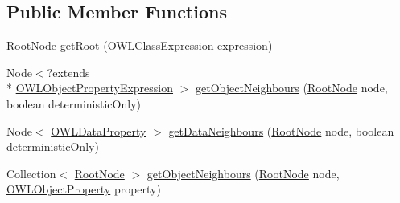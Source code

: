 \subsection*{Public Member Functions}
\begin{DoxyCompactItemize}
\item 
\hyperlink{interfaceorg_1_1semanticweb_1_1owlapi_1_1reasoner_1_1knowledgeexploration_1_1_o_w_l_knowledge_explorer_reasoner_1_1_root_node}{Root\-Node} \hyperlink{interfaceorg_1_1semanticweb_1_1owlapi_1_1reasoner_1_1knowledgeexploration_1_1_o_w_l_knowledge_explorer_reasoner_a97cbd43ff8f0c09b8eb188fc8f0d8dcf}{get\-Root} (\hyperlink{interfaceorg_1_1semanticweb_1_1owlapi_1_1model_1_1_o_w_l_class_expression}{O\-W\-L\-Class\-Expression} expression)
\item 
Node$<$?extends \\*
\hyperlink{interfaceorg_1_1semanticweb_1_1owlapi_1_1model_1_1_o_w_l_object_property_expression}{O\-W\-L\-Object\-Property\-Expression} $>$ \hyperlink{interfaceorg_1_1semanticweb_1_1owlapi_1_1reasoner_1_1knowledgeexploration_1_1_o_w_l_knowledge_explorer_reasoner_a3a1af2a6f64f76314d4d47a6076130fb}{get\-Object\-Neighbours} (\hyperlink{interfaceorg_1_1semanticweb_1_1owlapi_1_1reasoner_1_1knowledgeexploration_1_1_o_w_l_knowledge_explorer_reasoner_1_1_root_node}{Root\-Node} node, boolean deterministic\-Only)
\item 
Node$<$ \hyperlink{interfaceorg_1_1semanticweb_1_1owlapi_1_1model_1_1_o_w_l_data_property}{O\-W\-L\-Data\-Property} $>$ \hyperlink{interfaceorg_1_1semanticweb_1_1owlapi_1_1reasoner_1_1knowledgeexploration_1_1_o_w_l_knowledge_explorer_reasoner_aeb32685d5dd8c2881dbc4d30de1b9491}{get\-Data\-Neighbours} (\hyperlink{interfaceorg_1_1semanticweb_1_1owlapi_1_1reasoner_1_1knowledgeexploration_1_1_o_w_l_knowledge_explorer_reasoner_1_1_root_node}{Root\-Node} node, boolean deterministic\-Only)
\item 
Collection$<$ \hyperlink{interfaceorg_1_1semanticweb_1_1owlapi_1_1reasoner_1_1knowledgeexploration_1_1_o_w_l_knowledge_explorer_reasoner_1_1_root_node}{Root\-Node} $>$ \hyperlink{interfaceorg_1_1semanticweb_1_1owlapi_1_1reasoner_1_1knowledgeexploration_1_1_o_w_l_knowledge_explorer_reasoner_a3cf5bed2c3dca94d28b20d0c6e48b636}{get\-Object\-Neighbours} (\hyperlink{interfaceorg_1_1semanticweb_1_1owlapi_1_1reasoner_1_1knowledgeexploration_1_1_o_w_l_knowledge_explorer_reasoner_1_1_root_node}{Root\-Node} node, \hyperlink{interfaceorg_1_1semanticweb_1_1owlapi_1_1model_1_1_o_w_l_object_property}{O\-W\-L\-Object\-Property} property)
\item 

\end{DoxyCompactItemize}
